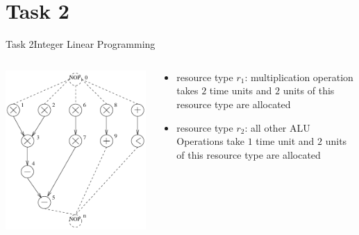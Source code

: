 
\section{Task 2}

\begin{frame}[allowframebreaks]{Task 2}{Integer Linear Programming}
  \begin{tasknoinc}
    \begin{columns}
      \begin{column}{.5\textwidth}
        \centering
        \includegraphics[height=.6\paperheight]{./figures/task2_sequence_graph.png}
      \end{column}
      \begin{column}{.5\textwidth}
        \begin{itemize}
          \item \alert{resource type $r_1$:} multiplication operation takes $2$ time units and $2$ units of this resource type are allocated
          \item \alert{resource type $r_2$:} all other ALU Operations take $1$ time unit and $2$ units of this resource type are allocated

\end{itemize}
\end{column}
\end{columns}
\end{tasknoinc}
\end{frame}
